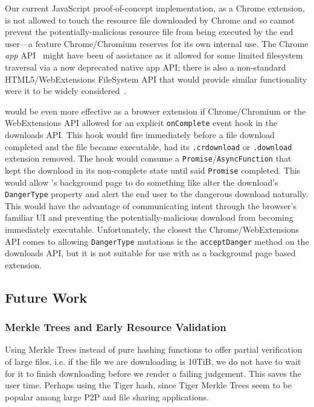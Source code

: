 Our current JavaScript proof-of-concept implementation, as a Chrome extension,
is not allowed to touch the resource file downloaded by Chrome and so cannot
prevent the potentially-malicious resource file from being executed by the end
user---a feature Chrome/Chromium reserves for its own internal use. The Chrome
\textit{app} API~\cite{AppAPI} might have been of assistance as it allowed for
some limited filesystem traversal via a now deprecated native app API; there is
also a non-standard HTML5/WebExtensions FileSystem API that would provide
similar functionality were it to be widely considered~\cite{deadSpec}.

\SYSTEM{} would be even more effective as a browser extension if Chrome/Chromium
or the WebExtensions API allowed for an explicit \texttt{onComplete} event hook
in the downloads API. This hook would fire immediately before a file download
completed and the file became executable, \ie had its \texttt{.crdownload} or
\texttt{.download} extension removed. The hook would consume a
\texttt{Promise}/\texttt{AsyncFunction} that kept the download in its
non-complete state until said \texttt{Promise} completed. This would allow
\SYSTEM{}'s background page to do something like alter the download's
\texttt{DangerType} property and alert the end user to the dangerous download
naturally. This would have the advantage of communicating intent through the
browser's familiar UI and preventing the potentially-malicious download from
becoming immediately executable. Unfortunately, the closest the
Chrome/WebExtensions API comes to allowing \texttt{DangerType} mutations is the
\texttt{acceptDanger} method on the downloads API, but it is not suitable for
use with \SYSTEM{} as a background page based extension.

\subsection{Future Work}

\subsubsection{Merkle Trees and Early Resource Validation}

Using Merkle Trees instead of pure hashing functions to offer partial
verification of large files, i.e. if the file we are downloading is 10TiB, we
do not have to wait for it to finish downloading before we render a failing
judgement. This saves the user time. Perhaps using the Tiger hash, since Tiger
Merkle Trees seem to be popular among large P2P and file sharing applications.

